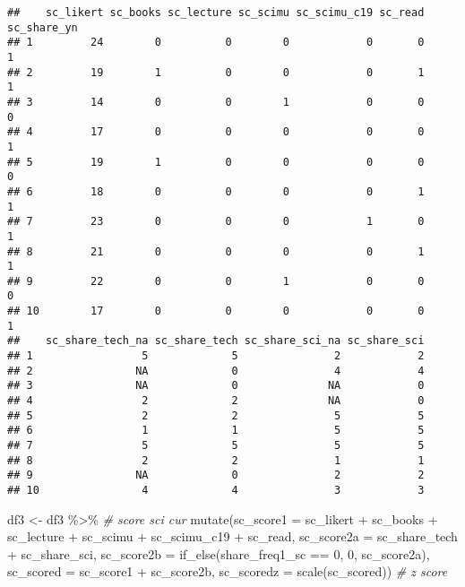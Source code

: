 \documentclass[
]{article}
\newenvironment{Shaded}{\begin{snugshade}}{\end{snugshade}}
\newcommand{\AttributeTok}[1]{\textcolor[rgb]{0.77,0.63,0.00}{#1}}
\newcommand{\CommentTok}[1]{\textcolor[rgb]{0.56,0.35,0.01}{\textit{#1}}}
\newcommand{\DecValTok}[1]{\textcolor[rgb]{0.00,0.00,0.81}{#1}}
\newcommand{\FunctionTok}[1]{\textcolor[rgb]{0.00,0.00,0.00}{#1}}
\newcommand{\NormalTok}[1]{#1}
\newcommand{\OtherTok}[1]{\textcolor[rgb]{0.56,0.35,0.01}{#1}}
\newcommand{\SpecialCharTok}[1]{\textcolor[rgb]{0.00,0.00,0.00}{#1}}
\begin{document}
\begin{verbatim}
##    sc_likert sc_books sc_lecture sc_scimu sc_scimu_c19 sc_read sc_share_yn
## 1         24        0          0        0            0       0           1
## 2         19        1          0        0            0       1           1
## 3         14        0          0        1            0       0           0
## 4         17        0          0        0            0       0           1
## 5         19        1          0        0            0       0           0
## 6         18        0          0        0            0       1           1
## 7         23        0          0        0            1       0           1
## 8         21        0          0        0            0       1           1
## 9         22        0          0        1            0       0           0
## 10        17        0          0        0            0       0           1
##    sc_share_tech_na sc_share_tech sc_share_sci_na sc_share_sci
## 1                 5             5               2            2
## 2                NA             0               4            4
## 3                NA             0              NA            0
## 4                 2             2              NA            0
## 5                 2             2               5            5
## 6                 1             1               5            5
## 7                 5             5               5            5
## 8                 2             2               1            1
## 9                NA             0               2            2
## 10                4             4               3            3
\end{verbatim}

\begin{Shaded}
\begin{Highlighting}[]
\NormalTok{df3 }\OtherTok{\textless{}{-}}\NormalTok{ df3 }\SpecialCharTok{\%\textgreater{}\%} \CommentTok{\# score sci cur}
  \FunctionTok{mutate}\NormalTok{(}\AttributeTok{sc\_score1 =}\NormalTok{ sc\_likert }\SpecialCharTok{+}\NormalTok{ sc\_books }\SpecialCharTok{+}\NormalTok{ sc\_lecture }\SpecialCharTok{+}\NormalTok{ sc\_scimu }\SpecialCharTok{+} 
\NormalTok{           sc\_scimu\_c19 }\SpecialCharTok{+}\NormalTok{ sc\_read,}
         \AttributeTok{sc\_score2a =}\NormalTok{ sc\_share\_tech }\SpecialCharTok{+}\NormalTok{ sc\_share\_sci,}
         \AttributeTok{sc\_score2b =} \FunctionTok{if\_else}\NormalTok{(share\_freq1\_sc }\SpecialCharTok{==} \DecValTok{0}\NormalTok{, }\DecValTok{0}\NormalTok{, sc\_score2a),}
         \AttributeTok{sc\_scored =}\NormalTok{ sc\_score1 }\SpecialCharTok{+}\NormalTok{ sc\_score2b,}
         \AttributeTok{sc\_scoredz =} \FunctionTok{scale}\NormalTok{(sc\_scored)) }\CommentTok{\# z score}
\end{Highlighting}
\end{Shaded}
\end{document}
